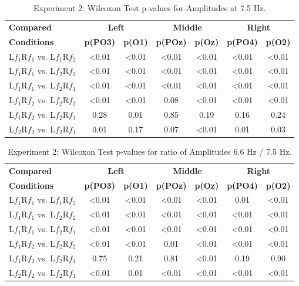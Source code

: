 \begin{table}[ht]
\centering
\begin{tabularx}{\linewidth}{l *{6}{c}}
    \toprule
    \textbf{Compared} & \multicolumn{2}{c}{\textbf{Left}} & \multicolumn{2}{c}{\textbf{Middle}} & \multicolumn{2}{c}{\textbf{Right}} \\
    \textbf{Conditions} & \textbf{p(PO3)} & \textbf{p(O1)} & \textbf{p(POz)} & \textbf{p(Oz)} & \textbf{p(PO4)} & \textbf{p(O2)} \\
    \midrule
    L$f_{1}$R$f_{1}$ vs. L$f_{1}$R$f_{2}$ & <0.01 & <0.01 & <0.01 & <0.01 & <0.01 & <0.01 \\
    L$f_{1}$R$f_{1}$ vs. L$f_{2}$R$f_{2}$ & <0.01 & <0.01 & <0.01 & <0.01 & <0.01 & <0.01 \\
    L$f_{1}$R$f_{1}$ vs. L$f_{2}$R$f_{1}$ & <0.01 & <0.01 & <0.01 & <0.01 & <0.01 & <0.01 \\
    L$f_{1}$R$f_{2}$ vs. L$f_{2}$R$f_{2}$ & <0.01 & <0.01 & 0.08 & <0.01 & <0.01 & <0.01 \\
    L$f_{1}$R$f_{2}$ vs. L$f_{2}$R$f_{1}$ & 0.28 & 0.01 & 0.85 & 0.19 & 0.16 & 0.24 \\
    L$f_{2}$R$f_{2}$ vs. L$f_{2}$R$f_{1}$ & 0.01 & 0.17 & 0.07 & <0.01 & 0.01 & 0.03 \\
    \bottomrule
\end{tabularx}
\caption{Experiment 2: Wilcoxon Test p-values for Amplitudes at 7.5 Hz.}
\label{tab:ex2-75}
\end{table}



\begin{table}[ht]
\centering
\begin{tabularx}{\linewidth}{l *{6}{c}}
    \toprule
    \textbf{Compared} & \multicolumn{2}{c}{\textbf{Left}} & \multicolumn{2}{c}{\textbf{Middle}} & \multicolumn{2}{c}{\textbf{Right}} \\
    \textbf{Conditions} & \textbf{p(PO3)} & \textbf{p(O1)} & \textbf{p(POz)} & \textbf{p(Oz)} & \textbf{p(PO4)} & \textbf{p(O2)} \\
    \midrule
    L$f_{1}$R$f_{1}$ vs. L$f_{1}$R$f_{2}$ & <0.01 & <0.01 & <0.01 & <0.01 & 0.01 & <0.01 \\
    L$f_{1}$R$f_{1}$ vs. L$f_{2}$R$f_{2}$ & <0.01 & <0.01 & <0.01 & <0.01 & <0.01 & <0.01 \\
    L$f_{1}$R$f_{1}$ vs. L$f_{2}$R$f_{1}$ & <0.01 & <0.01 & <0.01 & <0.01 & <0.01 & <0.01 \\
    L$f_{1}$R$f_{2}$ vs. L$f_{2}$R$f_{2}$ & <0.01 & <0.01 & 0.01 & <0.01 & <0.01 & <0.01 \\
    L$f_{1}$R$f_{2}$ vs. L$f_{2}$R$f_{1}$ & 0.75 & 0.21 & 0.81 & <0.01 & 0.19 & 0.90 \\
    L$f_{2}$R$f_{2}$ vs. L$f_{2}$R$f_{1}$ & <0.01 & 0.01 & <0.01 & <0.01 & <0.01 & <0.01 \\
    \bottomrule
\end{tabularx}
\caption{Experiment 2: Wilcoxon Test p-values for ratio of Amplitudes 6.6 Hz / 7.5 Hz.}
\label{tab:ex2-ratios}
\end{table}


